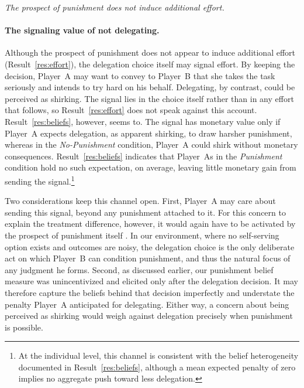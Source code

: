 \medskip
{} \textit{The prospect of punishment does not induce additional effort. %
}
\medskip

\paragraph{The signaling value of not delegating.} Although the prospect of punishment does not appear to induce additional effort (Result~\ref{res:effort}), the delegation choice itself may signal effort. By keeping the decision, Player~A may want to convey to Player~B that she takes the task seriously and intends to try hard on his behalf. Delegating, by contrast, could be perceived as shirking. The signal lies in the choice itself rather than in any effort that follows, so Result~\ref{res:effort} does not speak against this account. Result~\ref{res:beliefs}, however, seems to. The signal has monetary value only if Player~A expects delegation, as apparent shirking, to draw harsher punishment, whereas in the \textit{No-Punishment} condition, Player~A could shirk without monetary consequences. Result~\ref{res:beliefs} indicates that Player~As in the \textit{Punishment} condition hold no such expectation, on average, leaving little monetary gain from sending the signal.\footnote{At the individual level, this channel is consistent with the belief heterogeneity documented in Result~\ref{res:beliefs}, although a mean expected penalty of zero implies no aggregate push toward less delegation.}

Two considerations keep this channel open. First, Player~A may care about sending this signal, beyond any punishment attached to it. For this concern to explain the treatment difference, however, it would again have to be activated by the prospect of punishment itself%
. In our environment, where no self-serving option exists and outcomes are noisy, the delegation choice is the only deliberate act on which Player~B can condition punishment, and thus the natural focus of any judgment he forms. Second, as discussed earlier, our punishment belief measure was unincentivized and elicited only after the delegation decision. It may therefore capture the beliefs behind that decision imperfectly and understate the penalty Player~A anticipated for delegating. Either way, a concern about being perceived as shirking would weigh against delegation precisely when punishment is possible. 

